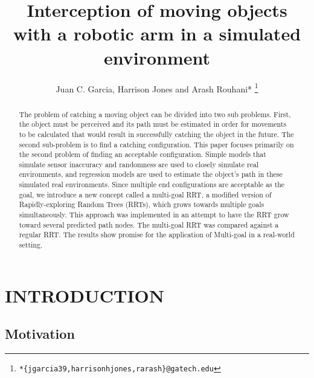 \documentclass[letterpaper, 10 pt, conference]{ieeeconf}  %
\title{\LARGE \bf
Interception of moving objects with a robotic arm in a simulated environment
}
\author{Juan C. Garcia, Harrison Jones and Arash Rouhani*
  \thanks{\texttt{*\{jgarcia39,harrisonhjones,rarash\}@gatech.edu}}
}
\begin{document}
\maketitle
\thispagestyle{empty}
\pagestyle{empty}


\begin{abstract}

The problem of catching a moving object can be divided into two sub problems.
First, the object must be perceived and its path must be estimated in order for
movements to be calculated that would result in successfully catching the
object in the future. The second sub-problem is to find a catching
configuration. This paper focuses primarily on the second problem of finding an
acceptable configuration. Simple models that simulate sensor inaccuracy and
randomness are used to closely simulate real environments, and regression
models are used to estimate the object's path in these simulated real
environments. Since multiple end configurations are acceptable as the goal, we
introduce a new concept called a multi-goal RRT, a modified version of
Rapidly-exploring Random Trees (RRTs), which grows towards multiple goals
simultaneously. This approach was implemented in an attempt to have the RRT
grow toward several predicted path nodes. The multi-goal RRT was compared
against a regular RRT. The results show promise for the application of
Multi-goal in a real-world setting.

\end{abstract}

\section{INTRODUCTION}

\subsection{Motivation}
\end{document}
